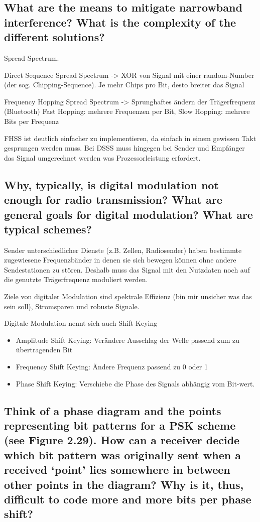 \subsection{What are the means to mitigate narrowband interference? What is the complexity of
the different solutions?}
Spread Spectrum.

Direct Sequence Spread Spectrum -> XOR von Signal mit einer random-Number (der sog. Chipping-Sequence). Je mehr Chips pro Bit, desto breiter das Signal


Frequency Hopping Spread Spectrum -> Sprunghaftes ändern der Trägerfrequenz (Bluetooth)
Fast Hopping: mehrere Frequenzen per Bit, Slow Hopping: mehrere Bits per Frequenz

FHSS ist deutlich einfacher zu implementieren, da einfach in einem gewissen Takt gesprungen werden muss. Bei DSSS muss hingegen bei Sender und Empfänger das Signal umgerechnet werden was Prozessorleistung erfordert.

\subsection{Why, typically, is digital modulation not enough for radio transmission? What are
general goals for digital modulation? What are typical schemes?}
Sender unterschiedlicher Dienste (z.B. Zellen, Radiosender) haben bestimmte zugewiesene  
Frequenzbänder in denen sie sich bewegen können ohne andere Sendestationen zu stören. Deshalb muss das Signal mit den Nutzdaten noch auf die genutzte Trägerfrequenz moduliert werden.

Ziele von digitaler Modulation sind spektrale Effizienz (bin mir unsicher was das sein soll), Stromsparen und robuste Signale.

Digitale Modulation nennt sich auch Shift Keying
\begin{itemize}

\item Amplitude Shift Keying: Verändere Ausschlag der Welle passend zum zu übertragenden Bit

\item Frequency Shift Keying: Ändere Frequenz passend zu 0 oder 1

\item Phase Shift Keying: Verschiebe die Phase des Signals abhängig vom Bit-wert.

\end{itemize}

\subsection{Think of a phase diagram and the points representing bit patterns for a PSK scheme
(see Figure 2.29). How can a receiver decide which bit pattern was originally sent
when a received ‘point’ lies somewhere in between other points in the diagram? Why
is it, thus, difficult to code more and more bits per phase shift?}


